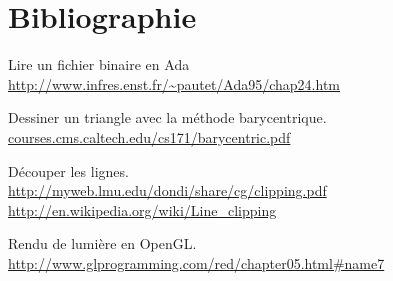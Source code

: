 \documentclass[10pt]{article}
\begin{document}
\section{Bibliographie}

Lire un fichier binaire en Ada \\
\url{http://www.infres.enst.fr/~pautet/Ada95/chap24.htm}

Dessiner un triangle avec la méthode barycentrique. \\
\url{courses.cms.caltech.edu/cs171/barycentric.pdf}

Découper les lignes. \\
\url{http://myweb.lmu.edu/dondi/share/cg/clipping.pdf} \\
\url{http://en.wikipedia.org/wiki/Line_clipping}

Rendu de lumière en OpenGL. \\
\url{http://www.glprogramming.com/red/chapter05.html#name7}
\end{document}
